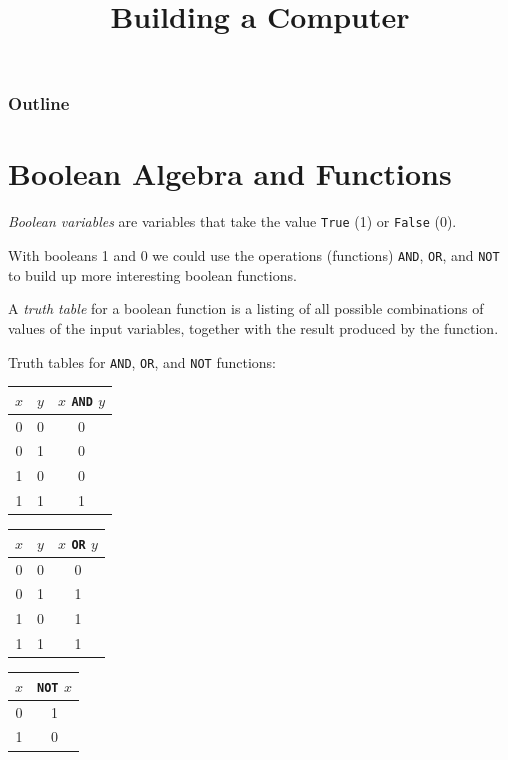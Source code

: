 \documentclass[8pt,a4paper,compress,handout]{beamer}
\title{Building a Computer}
\date{}
\begin{document}
\begin{frame}
\vfill
\titlepage
\end{frame}

\begin{frame}
\frametitle{Outline}
\tableofcontents
\end{frame}

\section{Boolean Algebra and Functions}
\begin{frame}[fragile]
\emph{Boolean variables} are variables that take the value \lstinline{True} (1) or \lstinline{False} (0).

\bigskip

With booleans 1 and 0 we could use the operations (functions) \lstinline{AND}, \lstinline{OR}, and \lstinline{NOT} to build up more interesting boolean functions.

\bigskip

A \emph{truth table} for a boolean function is a listing of all possible combinations of values of the input variables, together with the result produced by the function.

\bigskip

Truth tables for \lstinline{AND}, \lstinline{OR}, and \lstinline{NOT} functions:

\begin{center}
\begin{tabular}{cc|c}
$x$ & $y$ & $x$ \lstinline$AND$ $y$ \\ \hline
0 & 0 & 0 \\
0 & 1 & 0 \\
1 & 0 & 0 \\
1 & 1 & 1
\end{tabular}\hspace{1cm} \begin{tabular}{cc|c}
$x$ & $y$ & $x$ \lstinline$OR$ $y$ \\ \hline
0 & 0 & 0 \\
0 & 1 & 1 \\
1 & 0 & 1 \\
1 & 1 & 1
\end{tabular}\hspace{1cm} \begin{tabular}{c|c}
$x$ & \lstinline$NOT$ $x$ \\ \hline
0 & 1 \\
1 & 0
\end{tabular}
\end{center}
\end{frame}
\end{document}
